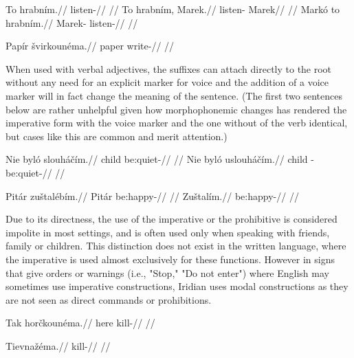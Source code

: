 \pex
\begingl
    \gla To hrabn\'im.//
    \glb {} listen-//
    \glft {}//
\endgl
\xe
\pex
\a
\begingl
    \gla To hrabn\'im, Marek.//
    \glb {} listen- Marek//
    \glft {}//
\endgl
\a
\begingl
    \gla Mark\'o to hrabn\'im.//
    \glb Marek-  listen-//
    \glft {}//
\endgl
\xe

\pex
\begingl
    \gla Pap\'ir \v{s}virkoun\'ema.//
    \glb paper write-//
    \glft {}//
\endgl
\xe

When used with verbal adjectives, the suffixes can attach directly to the root without any need for an explicit marker for voice and the addition of a voice marker will in fact change the meaning of the sentence. (The first two sentences below are rather unhelpful given how morphophonemic changes has rendered the imperative form with the voice marker and the one without of the verb  identical, but cases like this are common and merit attention.)

\pex
\a
\begingl
    \gla Nie byl\'o slouh\'a\v{c}\'im.//
    \glb {} child be:quiet-//
    \glft {}//
\endgl
\a
\begingl
    \gla Nie byl\'o uslouh\'a\v{c}\'im.//
    \glb {} child -be:quiet-//
    \glft {}//
\endgl
\xe

\pex
\a
\begingl
    \gla Pit\'ar zu\v{s}tal\'eb\'im.//
    \glb Pit\'ar be:happy-//
    \glft {}//
\endgl
\a
\begingl
    \gla Zu\v{s}tal\'im.//
    \glb be:happy-//
    \glft {}//
\endgl
\xe


Due to its directness, the use of the imperative or the prohibitive is considered impolite in most settings, and is often used only when speaking with friends, family or children. This distinction does not exist in the written language, where the imperative is used almost exclusively for these functions. However in signs that give orders or warnings (i.e., "Stop," "Do not enter") where English may sometimes use imperative constructions, Iridian uses modal constructions as they are not seen as direct commands or prohibitions.

\pex
\begingl
    \gla Tak hor\v{c}koun\'ema.//
    \glb here kill-//
    \glft {}//
\endgl
\xe

\pex
\begingl
    \gla Tievna\v{z}\'ema.//
    \glb kill-//
    \glft {}//
\endgl
\xe


